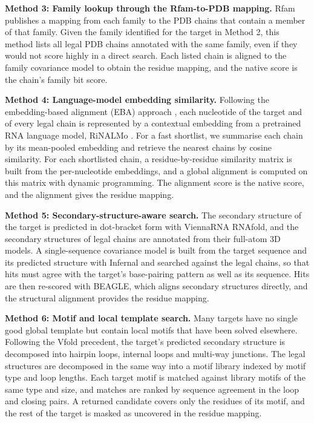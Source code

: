\documentclass{FastFyp}
\begin{document}
\textbf{Method 3: Family lookup through the Rfam-to-PDB mapping.} Rfam publishes a mapping from each family to the PDB chains that contain a member of that family. Given the family identified for the target in Method 2, this method lists all legal PDB chains annotated with the same family, even if they would not score highly in a direct search. Each listed chain is aligned to the family covariance model to obtain the residue mapping, and the native score is the chain's family bit score.

\textbf{Method 4: Language-model embedding similarity.} Following the embedding-based alignment (EBA) approach \cite{pantolini2024}, each nucleotide of the target and of every legal chain is represented by a contextual embedding from a pretrained RNA language model, RiNALMo \cite{ref:Penic:2024}. For a fast shortlist, we summarise each chain by its mean-pooled embedding and retrieve the nearest chains by cosine similarity. For each shortlisted chain, a residue-by-residue similarity matrix is built from the per-nucleotide embeddings, and a global alignment is computed on this matrix with dynamic programming. The alignment score is the native score, and the alignment gives the residue mapping.

\textbf{Method 5: Secondary-structure-aware search.} The secondary structure of the target is predicted in dot-bracket form with ViennaRNA RNAfold, and the secondary structures of legal chains are annotated from their full-atom 3D models. A single-sequence covariance model is built from the target sequence and its predicted structure with Infernal and searched against the legal chains, so that hits must agree with the target's base-pairing pattern as well as its sequence. Hits are then re-scored with BEAGLE, which aligns secondary structures directly, and the structural alignment provides the residue mapping.

\textbf{Method 6: Motif and local template search.} Many targets have no single good global template but contain local motifs that have been solved elsewhere. Following the Vfold precedent, the target's predicted secondary structure is decomposed into hairpin loops, internal loops and multi-way junctions. The legal structures are decomposed in the same way into a motif library indexed by motif type and loop lengths. Each target motif is matched against library motifs of the same type and size, and matches are ranked by sequence agreement in the loop and closing pairs. A returned candidate covers only the residues of its motif, and the rest of the target is masked as uncovered in the residue mapping.
\end{document}
